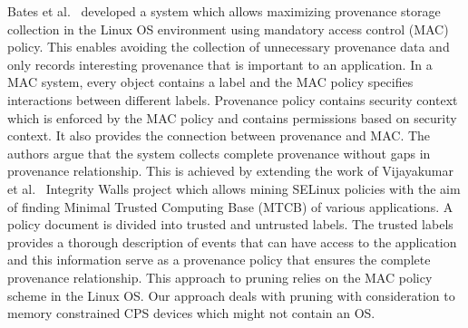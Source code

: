 Bates et al.~\cite{Bates:2015:TOY:2814579.2814586} developed a system which allows maximizing provenance storage collection in the Linux OS environment using mandatory access control (MAC) policy. This enables avoiding the collection of unnecessary provenance data and only records interesting provenance that is important to an application. In a MAC system, every object contains a label and the MAC policy specifies interactions between different labels. Provenance policy contains security context which is enforced by the MAC policy and contains permissions based on security context. It also provides the connection between provenance and MAC. The authors argue that the system collects complete provenance without gaps in provenance relationship. This is achieved by extending the work of Vijayakumar et al.~\cite{asiaccs12-vijayakumar} Integrity Walls project which allows mining SELinux policies with the aim of finding Minimal Trusted Computing Base (MTCB) of various applications. A policy document is divided into trusted and untrusted labels. The trusted labels provides a thorough description of events that can have access to the application and this information serve as a provenance policy that ensures the complete provenance relationship. This approach to pruning relies on the MAC policy scheme in the Linux OS. Our approach deals with pruning with consideration to memory constrained CPS devices which might not contain an OS. 

%

